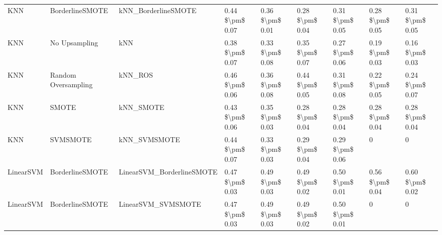 \begin{tabular}{lllllllll}
                            KNN &               BorderlineSMOTE &                          kNN\_BorderlineSMOTE & 0.44 \$\textbackslash pm\$ 0.07 &           0.36 \$\textbackslash pm\$ 0.01 &       0.28 \$\textbackslash pm\$ 0.04 &        0.31 \$\textbackslash pm\$ 0.05 &                         0.28 \$\textbackslash pm\$ 0.05 &     0.31 \$\textbackslash pm\$ 0.05 \\
                            KNN &                 No Upsampling &                                          kNN & 0.38 \$\textbackslash pm\$ 0.07 &           0.33 \$\textbackslash pm\$ 0.08 &       0.35 \$\textbackslash pm\$ 0.07 &        0.27 \$\textbackslash pm\$ 0.06 &                         0.19 \$\textbackslash pm\$ 0.03 &     0.16 \$\textbackslash pm\$ 0.03 \\
                            KNN &           Random Oversampling &                                      kNN\_ROS & 0.46 \$\textbackslash pm\$ 0.06 &           0.36 \$\textbackslash pm\$ 0.08 &       0.44 \$\textbackslash pm\$ 0.05 &        0.31 \$\textbackslash pm\$ 0.08 &                         0.22 \$\textbackslash pm\$ 0.05 &     0.24 \$\textbackslash pm\$ 0.07 \\
                            KNN &                         SMOTE &                                    kNN\_SMOTE & 0.43 \$\textbackslash pm\$ 0.06 &           0.35 \$\textbackslash pm\$ 0.03 &       0.28 \$\textbackslash pm\$ 0.04 &        0.28 \$\textbackslash pm\$ 0.04 &                         0.28 \$\textbackslash pm\$ 0.04 &     0.28 \$\textbackslash pm\$ 0.04 \\
                            KNN &                      SVMSMOTE &                                 kNN\_SVMSMOTE & 0.44 \$\textbackslash pm\$ 0.07 &           0.33 \$\textbackslash pm\$ 0.03 &       0.29 \$\textbackslash pm\$ 0.04 &        0.29 \$\textbackslash pm\$ 0.06 &                                       0 &                   0 \\
                      LinearSVM &               BorderlineSMOTE &                    LinearSVM\_BorderlineSMOTE & 0.47 \$\textbackslash pm\$ 0.03 &           0.49 \$\textbackslash pm\$ 0.03 &       0.49 \$\textbackslash pm\$ 0.02 &        0.50 \$\textbackslash pm\$ 0.01 &                         0.56 \$\textbackslash pm\$ 0.04 &     0.60 \$\textbackslash pm\$ 0.02 \\
                      LinearSVM &               BorderlineSMOTE &                           LinearSVM\_SVMSMOTE & 0.47 \$\textbackslash pm\$ 0.03 &           0.49 \$\textbackslash pm\$ 0.03 &       0.49 \$\textbackslash pm\$ 0.02 &        0.50 \$\textbackslash pm\$ 0.01 &                                       0 &                   0 \\

\end{tabular}
